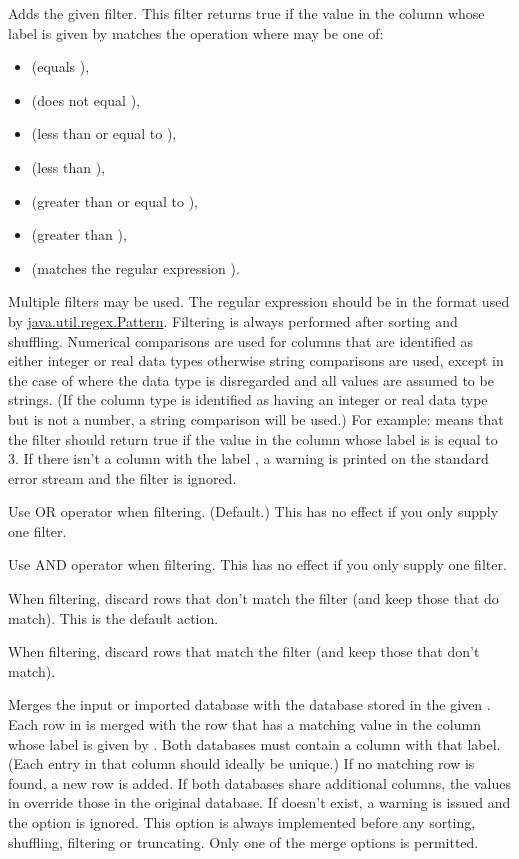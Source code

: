 Adds the given filter. This filter returns true if the value in
the column whose label is given by 
matches the operation  
where  may be one of:
\begin{itemize}
\item {} (equals ),
\item {} (does not equal ),
\item {} (less than or equal to ),
\item {} (less than ),
\item {} (greater than or equal to ),
\item {} (greater than ),
\item {} (matches the regular expression ).
\end{itemize}
Multiple filters may be used. The regular expression
should be in the format used by
\href{http://docs.oracle.com/javase/7/docs/api/java/util/regex/Pattern.html}{java.util.regex.Pattern}.
Filtering is always performed after sorting and shuffling.
Numerical comparisons are used for columns that are identified 
as either integer or real data types otherwise string
comparisons are used, except in the case of 
 where the data type is disregarded
and all values are assumed to be strings. (If the column type
is identified as having an integer or real data type but
 is not a number, a string comparison will be used.)
For example: 
means that the filter should return true if the value in the column
whose label is  is equal to 3.
If there isn't a column with the label , 
a warning is printed on the standard error stream and the
filter is ignored.

Use OR operator when filtering. (Default.)
This has no effect if you only supply one filter.

Use AND operator when filtering. 
This has no effect if you only supply one filter.

When filtering, discard rows that don't match the filter (and keep
those that do match). This is the default action.

When filtering, discard rows that match the filter (and keep those that don't match).

Merges the input or imported database with the database stored
in the given . Each row
in  is merged with the row that has a matching
value in the column whose label is given by .
Both databases must contain a column with that label. (Each entry
in that column should ideally be unique.)
If no matching row is found, a new row is added. If both databases
share additional columns, the values in 
override those in the original database. If 
doesn't exist, a warning is issued and the option is ignored.
This option is always implemented before any sorting, shuffling,
filtering or truncating. Only one of the merge options is permitted.

